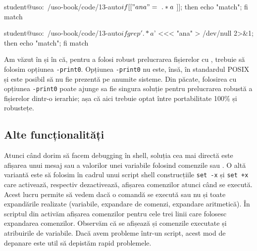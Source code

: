 \begin{screen}[caption={Alternativă la folosirea {[[} (grep)},label={lst:auto:grep-vs-if-brackets}]
student@uso:~/uso-book/code/13-auto$ if [[ "ana" =~ .*a$ ]]; then echo "match"; fi
match

student@uso:~/uso-book/code/13-auto$ if grep '.*a$' <<< "ana" > /dev/null 2>&1; then echo "match"; fi
match
\end{screen}

Am văzut în  și în  că, pentru a folosi robust prelucrarea fișierelor cu , trebuie să folosim opțiunea \texttt{-print0}.
Opțiunea \texttt{-print0} nu este, însă, în standardul POSIX și este posibil să nu fie prezentă pe anumite sisteme.
Din păcate, folosirea  cu opțiunea \texttt{-print0} poate ajunge sa fie singura soluție pentru prelucrarea robustă a fișierelor dintr-o ierarhie;
așa că aici trebuie optat între portabilitate 100\% și robustețe.

\subsection{Alte funcționalități}
\label{sec:auto:script-advanced:other}

Atunci când dorim să facem debugging în shell, soluția cea mai directă este afișarea unui mesaj sau a valorilor unei variabile folosind comenzile  sau .
O altă variantă este să folosim în cadrul unui script shell construcțiile \texttt{set -x} și \texttt{set +x} care activează, respectiv dezactivează, afișarea comenzilor atunci când se execută.
Acest lucru permite să vedem dacă o comandă se execută sau nu și toate expandările realizate (variabile, expandare de comenzi, expandare aritmetică).
În scriptul  din  activăm afișarea comenzilor pentru cele trei linii care folosesc expandarea comenzilor.
Observăm că se afișează și comenzile executate și atribuirile de variabile.
Dacă avem probleme într-un script, acest mod de depanare este util să depistăm rapid problemele.


